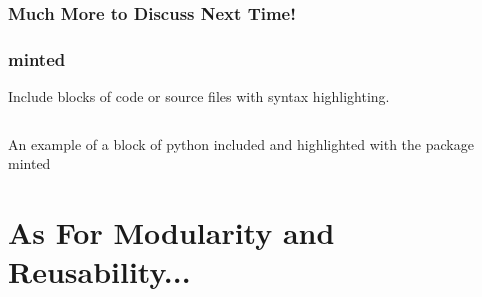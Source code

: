 \documentclass[titlepage, hidelinks, 12pt]{article}%
\begin{document}
            \subsubsection{Much More to Discuss Next Time!}

        \subsubsection{minted}
            Include blocks of code or source files with syntax highlighting.
            \begin{listing}[H]
                \inputminted{python}{./demo.py}
                \caption{An example of a block of python included and highlighted with the package minted}
                \label{lst:pythonExample}
            \end{listing}


    \section{As For Modularity and Reusability...}
\end{document}
